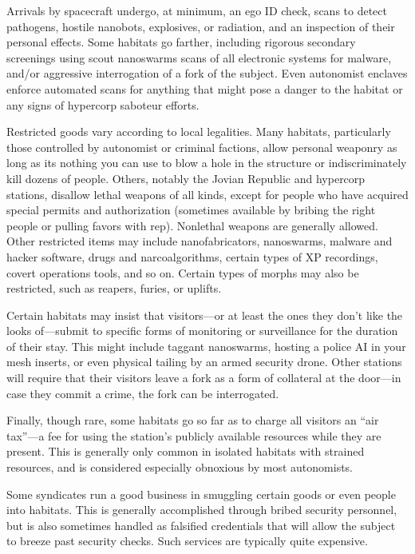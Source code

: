 Arrivals by spacecraft undergo, at minimum, an ego 
ID check, scans to detect pathogens, hostile nanobots, 
explosives, or radiation, and an inspection of their 
personal effects. Some habitats go farther, including 
rigorous secondary screenings using scout nanoswarms
scans of all electronic systems for malware,
and/or aggressive interrogation of a fork of the subject. 
Even autonomist enclaves enforce automated scans for 
anything that might pose a danger to the habitat or 
any signs of hypercorp saboteur efforts.

Restricted goods vary according to local legalities. 
Many habitats, particularly those controlled by autonomist
or criminal factions, allow personal weaponry
as long as its nothing you can use to blow a hole in 
the structure or indiscriminately kill dozens of people. 
Others, notably the Jovian Republic and hypercorp 
stations, disallow lethal weapons of all kinds, except 
for people who have acquired special permits and authorization
(sometimes available by bribing the right
people or pulling favors with rep). Nonlethal weapons 
are generally allowed. Other restricted items may 
include nanofabricators, nanoswarms, malware and 
hacker software, drugs and narcoalgorithms, certain 
types of XP recordings, covert operations tools, and 
so on. Certain types of morphs may also be restricted, 
such as reapers, furies, or uplifts.

Certain habitats may insist that visitors—or at 
least the ones they don't like the looks of—submit to 
specific forms of monitoring or surveillance for the 
duration of their stay. This might include taggant 
nanoswarms, hosting a police AI in your mesh inserts, 
or even physical tailing by an armed security drone. 
Other stations will require that their visitors leave a 
fork as a form of collateral at the door—in case they 
commit a crime, the fork can be interrogated.

Finally, though rare, some habitats go so far as to 
charge all visitors an ``air tax''—a fee for using the 
station's publicly available resources while they are 
present. This is generally only common in isolated 
habitats with strained resources, and is considered 
especially obnoxious by most autonomists.

Some syndicates run a good business in smuggling 
certain goods or even people into habitats. This is generally
accomplished through bribed security personnel,
but is also sometimes handled as falsified credentials 
that will allow the subject to breeze past security 
checks. Such services are typically quite expensive.

